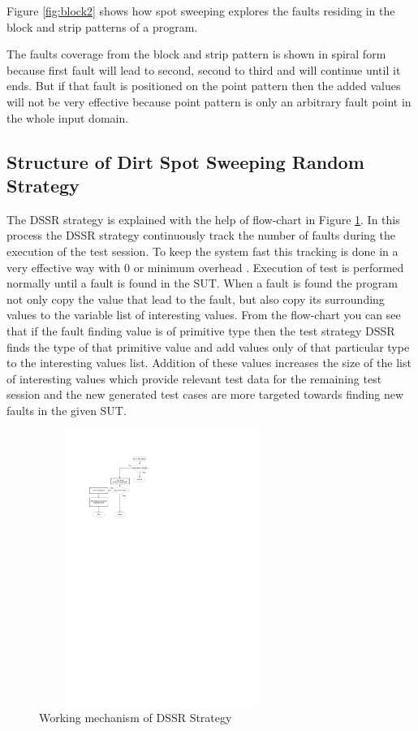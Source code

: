 \documentclass[conference]{IEEEtran}
\begin{document}
Figure \ref{fig:block2} shows how spot sweeping explores the faults residing in the block and strip patterns of a program. 

The faults coverage from the block and strip pattern is shown in spiral form because first fault will lead to second, second to third and will continue until it ends. But if that fault is positioned on the point pattern then the added values will not be very effective because point pattern is only an arbitrary fault point in the whole input domain.

\subsection{Structure of Dirt Spot Sweeping Random Strategy}

\hspace{10 mm}The DSSR strategy is explained with the help of flow-chart in Figure \ref{fig:Working_DSSS}. In this process the DSSR strategy continuously track the number of faults during the execution of the test session. To keep the system fast this tracking is done in a very effective way with 0 or minimum overhead \cite{Leitner2009}. Execution of test is performed normally until a fault is found in the SUT. When a fault is found the program not only copy the value that lead to the fault, but also copy its surrounding values to the variable list of interesting values. From the flow-chart you can see that if the fault finding value is of primitive type then the test strategy DSSR finds the type of that primitive value and add values only of that particular type to the interesting values list. Addition of these values increases the size of the list of interesting values which provide relevant test data for the remaining test session and the new generated test cases are more targeted towards finding new faults in the given SUT.\\
\begin{figure}[ht]
\centering
\includegraphics[width=8cm,height=9cm]{flowchart1.pdf}
\caption{Working mechanism of DSSR Strategy}
\label{fig:Working_DSSS}
\end{figure}
\end{document}
